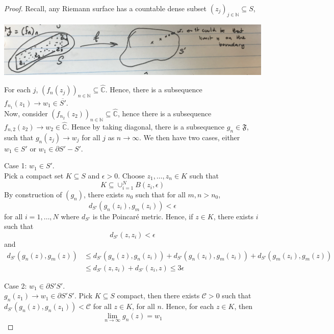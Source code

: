 \documentclass[a4paper, 11pt]{book}
\theoremstyle{definition}
\theoremstyle{remark}
\begin{document}
    \begin{proof}
        Recall, any Riemann surface has a countable dense subset $(z_j)_{j\in\mathbb{N}}\subseteq S$,
        \begin{center}
            \includegraphics[scale=0.05]{IMG_1024}
        \end{center}
        For each $j$, $(f_n(z_j))_{n\in\mathbb{N}}\subseteq\hat{\mathbb{C}}$. Hence, there is a subsequence $f_{n_1}(z_1)\to w_1\in
        \overline{S'}$.\\

        Now, consider $(f_{n_2}(z_2))_{n\in\mathbb{N}}\subseteq\hat{\mathbb{C}}$, hence there is a subsequence 
        $f_{n,2}(z_2)\to w_2\in\hat{\mathbb{C}}$. Hence by taking diagonal, there is a subsequence $g_n\in\mathfrak{F}$, such that
        $g_n(z_j) \to w_j$ for all $j$ as $n\to\infty$. We then have two cases, either $w_1\in S'$ or $w_1\in\partial{S'}-S'$.

        Case 1: $w_1\in S'$.\\
        Pick a compact set $K\subseteq S$ and $\epsilon>0$. Choose $z_1,\hdots,z_n\in K$ such that
        \[ K \subseteq \cup_{i=1}^N B(z_i,\epsilon) \]
        By construction of $(g_n)$, there exists $n_0$ such that for all $m,n > n_0$,
        \[ d_{S'}(g_n(z_i),g_m(z_i)) < \epsilon \]
        for all $i = 1,\hdots,N$ where $d_{S'}$ is the Poincaré metric. Hence, if $z\in K$, there exists $i$ such that
        \[ d_{S'}(z,z_i)<\epsilon \]
        and
        \begin{align*}
            d_{S'}(g_n(z),g_m(z)) &\leq d_{S'}(g_n(z),g_n(z_i)) + d_{S'}(g_n(z_i),g_m(z_i)) + d_{S'}(g_m(z_i),g_m(z)) \\
            &\leq d_{S'}(z,z_i) + d_{S'}(z_i,z) \leq 3\epsilon
        \end{align*}

        Case 2: $w_1\in \partial{S'}{S'}$.\\
        $g_n(z_1)\to w_1\in \partial{S'}{S'}$. Pick $K\subseteq S$ compact, then there exists $\mathcal{C}>0$ such that
        $d_{S'}(g_n(z),g_n(z_1)) < \mathcal{C}$ for all $z\in K$, for all $n$. Hence, for each $z\in K$, then
        \[ \lim_{n\to\infty} g_n(z) = w_1 \]
    \end{proof}
\end{document}
